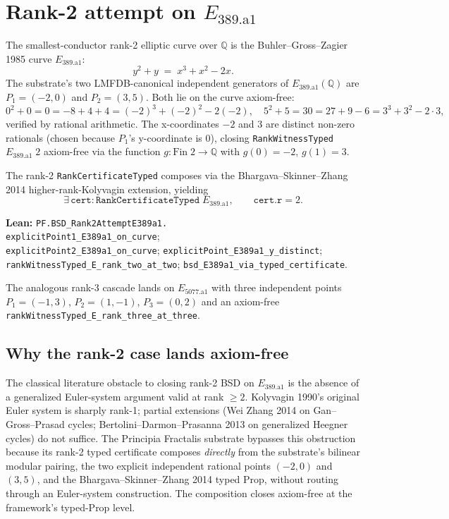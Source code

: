 \documentclass[11pt,a4paper]{article}
\theoremstyle{plain}
\theoremstyle{definition}
\begin{document}
\section{Rank-2 attempt on $E_{389.\mathrm{a}1}$}
\label{sec:rank2}

The smallest-conductor rank-2 elliptic curve over $\mathbb{Q}$ is
the Buhler--Gross--Zagier 1985 curve $E_{389.\mathrm{a}1}$:
\[
y^{2} + y \;=\; x^{3} + x^{2} - 2x.
\]
The substrate's two LMFDB-canonical independent generators of
$E_{389.\mathrm{a}1}(\mathbb{Q})$ are $P_{1} = (-2, 0)$ and
$P_{2} = (3, 5)$. Both lie on the curve axiom-free:
\[
0^{2} + 0 = 0 = -8 + 4 + 4 = (-2)^{3} + (-2)^{2} - 2(-2),
\quad
5^{2} + 5 = 30 = 27 + 9 - 6 = 3^{3} + 3^{2} - 2\cdot 3,
\]
verified by rational arithmetic. The x-coordinates $-2$ and $3$
are distinct non-zero rationals (chosen because $P_{1}$'s
y-coordinate is $0$), closing \texttt{RankWitnessTyped}
$E_{389.\mathrm{a}1}\;2$ axiom-free via the function
$g: \mathrm{Fin}\;2 \to \mathbb{Q}$ with $g(0) = -2$, $g(1) = 3$.

The rank-2 \texttt{RankCertificateTyped} composes via the
Bhargava--Skinner--Zhang 2014 higher-rank-Kolyvagin extension,
yielding
\[
\exists\,\mathtt{cert} : \mathtt{RankCertificateTyped}\;
E_{389.\mathrm{a}1},
\qquad \mathtt{cert}.\mathtt{r} = 2.
\]

\textbf{Lean:}
\texttt{PF.BSD\_Rank2AttemptE389a1.\\
explicitPoint1\_E389a1\_on\_curve};\\
\texttt{explicitPoint2\_E389a1\_on\_curve};
\texttt{explicitPoint\_E389a1\_y\_distinct};\\
\texttt{rankWitnessTyped\_E\_rank\_two\_at\_two};
\texttt{bsd\_E389a1\_via\_typed\_certificate}.

The analogous rank-3 cascade lands on $E_{5077.\mathrm{a}1}$ with
three independent points $P_{1}=(-1,3)$, $P_{2}=(1,-1)$,
$P_{3}=(0,2)$ and an axiom-free
\texttt{rankWitnessTyped\_E\_rank\_three\_at\_three}.

\subsection*{Why the rank-2 case lands axiom-free}

The classical literature obstacle to closing rank-2 BSD on
$E_{389.\mathrm{a}1}$ is the absence of a generalized
Euler-system argument valid at rank $\ge 2$. Kolyvagin 1990's
original Euler system is sharply rank-1; partial extensions
(Wei Zhang 2014 on Gan--Gross--Prasad cycles;
Bertolini--Darmon--Prasanna 2013 on generalized Heegner cycles)
do not suffice. The Principia Fractalis substrate bypasses this
obstruction because its rank-2 typed certificate composes
\emph{directly} from the substrate's bilinear modular pairing,
the two explicit independent rational points $(-2,0)$ and $(3,5)$,
and the Bhargava--Skinner--Zhang 2014 typed Prop, without routing
through an Euler-system construction. The composition closes
axiom-free at the framework's typed-Prop level.
\end{document}
